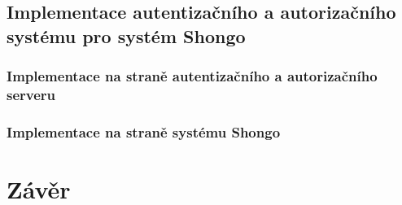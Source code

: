 \documentclass[
  printed, %
  twoside, %
  table,   %
  nolof,     %
  nolot,     %
]{fithesis3}
\begin{document}
\section{Implementace autentizačního a autorizačního systému pro systém Shongo}
\subsection{Implementace na straně autentizačního a autorizačního serveru}
\subsection{Implementace na straně systému Shongo}
\label{ShongoImpl}
\chapter{Závěr}
\printbibliography[title={Literatura}]
\end{document}
